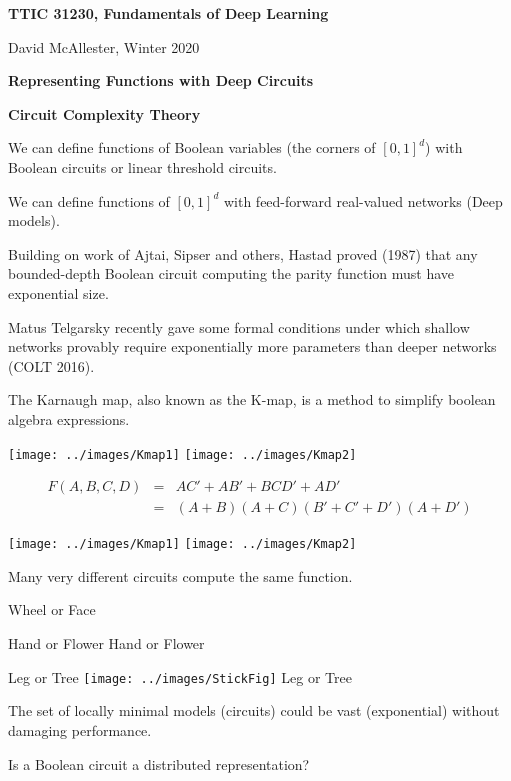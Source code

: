 




{\Huge

  \centerline{\bf TTIC 31230, Fundamentals of Deep Learning}
  \bigskip
  \centerline{David McAllester, Winter 2020}

  \vfill
  \centerline{\bf Representing Functions with Deep Circuits}
  \vfill
  \centerline{\bf Circuit Complexity Theory}
  \vfill
  \vfill


We can define functions of Boolean variables (the corners of $[0,1]^d$) with Boolean circuits or linear threshold circuits.

\vfill
We can define functions of $[0,1]^d$ with feed-forward real-valued networks (Deep models).


Building on work of Ajtai, Sipser and others, Hastad proved (1987) that any bounded-depth Boolean circuit computing the parity function must have exponential size. 

\vfill
Matus Telgarsky recently gave some formal conditions under which shallow networks provably require exponentially more parameters than deeper networks (COLT 2016).



The Karnaugh map, also known as the K-map, is a method to simplify boolean algebra expressions.

\vfil
\centerline{\texttt{[image: ../images/Kmap1]} \hspace{1.0in} \texttt{[image: ../images/Kmap2]}}

\begin{eqnarray*}
  F(A,B,C,D) & = & AC' + AB' + BCD' + AD' \\
  & = & (A+B)(A+C)(B' + C' + D')(A+D')
\end{eqnarray*}


\vfil
\centerline{\texttt{[image: ../images/Kmap1]} \hspace{1.0in} \texttt{[image: ../images/Kmap2]}}

Many very different circuits compute the same function.


{\color{red}
  
\centerline{Wheel or Face}

\vfill
\centerline{Hand or Flower \hspace{2.5in} Hand or Flower}

\vfill
\centerline{Leg or Tree  \texttt{[image: ../images/StickFig]} Leg or Tree}
}

\vfill
The set of locally minimal models (circuits) could be vast (exponential) without damaging performance.

\vfill
Is a Boolean circuit a distributed representation?


}

